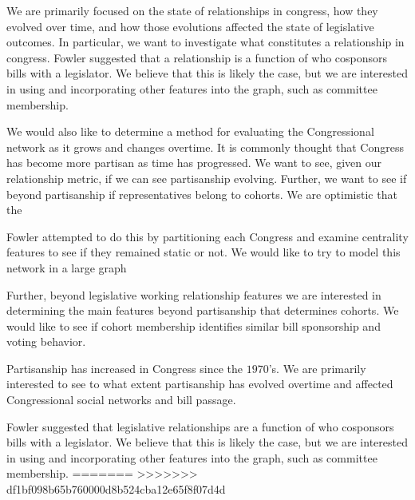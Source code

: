 We are primarily focused on the state of relationships in congress, how 
they evolved over time, and how those evolutions affected the state of 
legislative outcomes. In particular, we want to investigate what constitutes a 
relationship in congress. Fowler suggested that a relationship is a function 
of who cosponsors bills with a legislator. We believe that this is likely the 
case, but we are interested in using and incorporating other features into 
the graph, such as committee membership. 

We would also like to determine a method for evaluating the Congressional
network as it grows and changes overtime. It is commonly thought that Congress
has become more partisan as time has progressed. We want to see, given our
relationship metric, if we can see partisanship evolving. Further, we want to
see if beyond partisanship if representatives belong to cohorts. We are 
optimistic that the

Fowler attempted to do this by  partitioning each Congress and examine
centrality features to see if they  remained static or not. We would like to try
to model this network in a  large graph

Further, beyond legislative working relationship features we are interested in 
determining the main features beyond partisanship that determines cohorts. We 
would like to see if cohort membership identifies similar bill sponsorship and 
voting behavior.

Partisanship has increased in Congress since the $1970$'s. We are primarily 
interested to see to what extent partisanship has evolved overtime and affected 
Congressional social networks and bill passage.

Fowler suggested that legislative relationships are a function  of who
cosponsors bills with a legislator. We believe that this is likely the  case,
but we are interested in using and incorporating other features into  the graph,
such as committee membership. 
=======
>>>>>>> df1bf098b65b760000d8b524cba12e65f8f07d4d
